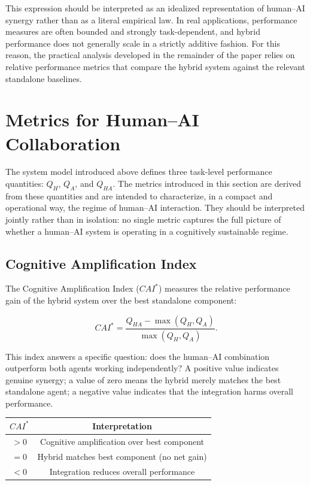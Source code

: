 \documentclass[11pt]{article}
\begin{document}
This expression should be interpreted as an idealized representation of
human--AI synergy rather than as a literal empirical law. In real
applications, performance measures are often bounded and strongly
task-dependent, and hybrid performance does not generally scale in a
strictly additive fashion. For this reason, the practical analysis
developed in the remainder of the paper relies on relative performance
metrics that compare the hybrid system against the relevant standalone
baselines.

\section{Metrics for Human--AI Collaboration}

The system model introduced above defines three task-level performance
quantities: $Q_H$, $Q_A$, and $Q_{HA}$. The metrics introduced in this
section are derived from these quantities and are intended to
characterize, in a compact and operational way, the regime of
human--AI interaction. They should be interpreted jointly rather than
in isolation: no single metric captures the full picture of whether
a human--AI system is operating in a cognitively sustainable regime.

\subsection{Cognitive Amplification Index}

The Cognitive Amplification Index ($CAI^*$) measures the relative
performance gain of the hybrid system over the best standalone
component:

\begin{equation}
CAI^* = \frac{Q_{HA} - \max(Q_H, Q_A)}{\max(Q_H, Q_A)}.
\end{equation}

This index answers a specific question: does the human--AI combination
outperform both agents working independently? A positive value indicates
genuine synergy; a value of zero means the hybrid merely matches the
best standalone agent; a negative value indicates that the integration
harms overall performance.

\begin{center}
\begin{tabular}{cc}
\toprule
$CAI^*$ & Interpretation \\
\midrule
$> 0$   & Cognitive amplification over best component \\
$= 0$   & Hybrid matches best component (no net gain) \\
$< 0$   & Integration reduces overall performance \\
\bottomrule
\end{tabular}
\end{center}
\end{document}
